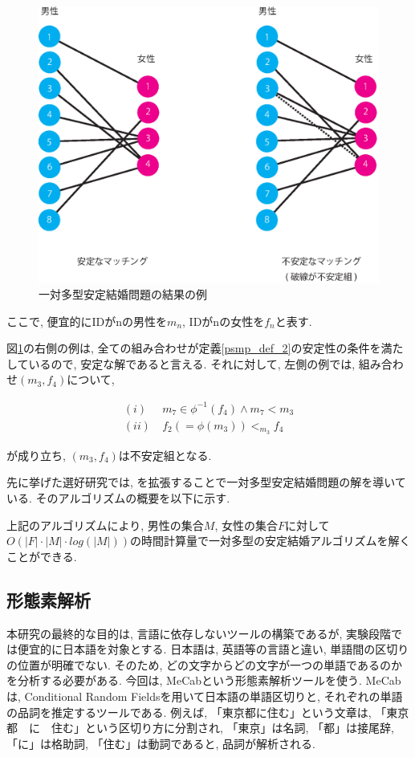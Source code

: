 \documentclass[12pt]{jarticle}
\begin{document}
\begin{figure}
  \begin{center}
    \includegraphics[scale = 0.5]{image/psmp.eps}
  \end{center}
  \caption{一対多型安定結婚問題の結果の例}
  \label{result_of_psmp}
\end{figure}

ここで, 便宜的にIDがnの男性を$m_n$, IDがnの女性を$f_n$と表す.

図\ref{result_of_psmp}の右側の例は, 全ての組み合わせが定義\ref{psmp_def_2}の安定性の条件を満たしているので, 安定な解であると言える.
それに対して, 左側の例では, 組み合わせ$(m_3, f_4)$について,

\begin{align}
(i)  & \ m_7 \in \phi^{-1} (f_4) \land m_7 < m_3   \\
(ii) & \ f_2(= \phi(m_3)) < _{m_3} f_4
\end{align}

が成り立ち, $(m_3, f_4)$は不安定組となる.

先に挙げた選好研究\cite{psmp}では, \gsa を拡張することで一対多型安定結婚問題の解を導いている.
そのアルゴリズムの概要を以下に示す.



上記のアルゴリズムにより, 男性の集合$M$, 女性の集合$F$に対して$O(|F| \cdot |M| \cdot log(|M|))$の時間計算量で一対多型の安定結婚アルゴリズムを解くことができる.

\subsection{形態素解析}
本研究の最終的な目的は, 言語に依存しないツールの構築であるが, 実験段階では便宜的に日本語を対象とする. 日本語は, 英語等の言語と違い, 単語間の区切りの位置が明確でない. そのため, どの文字からどの文字が一つの単語であるのかを分析する必要がある. 今回は, MeCab\cite{MeCab}という形態素解析ツールを使う. MeCabは, Conditional Random Fieldsを用いて日本語の単語区切りと, それぞれの単語の品詞を推定するツールである. 例えば, 「東京都に住む」という文章は, 「東京　都　に　住む」という区切り方に分割され, 「東京」は名詞, 「都」は接尾辞, 「に」は格助詞, 「住む」は動詞であると, 品詞が解析される.
\end{document}
